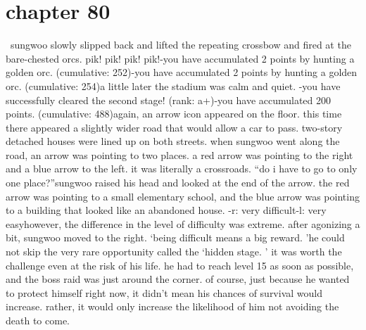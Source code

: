 \section{chapter 80}






 sungwoo slowly slipped back and lifted the repeating crossbow and fired at the bare-chested orcs.
pik! pik! pik! pik!-you have accumulated 2 points by hunting a golden orc.
 (cumulative: 252)-you have accumulated 2 points by hunting a golden orc.
 (cumulative: 254)a little later the stadium was calm and quiet.
-you have successfully cleared the second stage! (rank: a+)-you have accumulated 200 points.
 (cumulative: 488)again, an arrow icon appeared on the floor.
 this time there appeared a slightly wider road that would allow a car to pass.
two-story detached houses were lined up on both streets.
 when sungwoo went along the road, an arrow was pointing to two places.
a red arrow was pointing to the right and a blue arrow to the left.
 it was literally a crossroads.
“do i have to go to only one place?”sungwoo raised his head and looked at the end of the arrow.
 the red arrow was pointing to a small elementary school, and the blue arrow was pointing to a building that looked like an abandoned house.
-r: very difficult-l: very easyhowever, the difference in the level of difficulty was extreme.
after agonizing a bit, sungwoo moved to the right.
‘being difficult means a big reward.
’he could not skip the very rare opportunity called the ‘hidden stage.
’ it was worth the challenge even at the risk of his life.
 he had to reach level 15 as soon as possible, and the boss raid was just around the corner.
of course, just because he wanted to protect himself right now, it didn’t mean his chances of survival would increase.
 rather, it would only increase the likelihood of him not avoiding the death to come.

